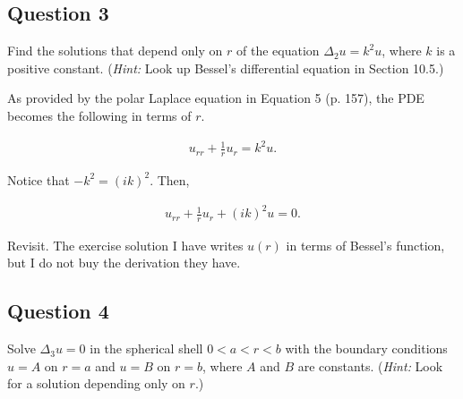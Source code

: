 \documentclass[a4paper, 10pt]{article}
\newenvironment{answer}[1][Answer]{\begin{trivlist}
\item[\hskip\labelsep{\textit{#1.}}]}{\end{trivlist}}
\begin{document}
\subsection{Question 3}

Find the solutions that depend only on $r$ of the equation $\Delta_2 u = k^2 u$, where $k$ is a positive constant. (\textit{Hint:} Look up Bessel's differential equation in Section 10.5.)

\begin{answer}
    As provided by the polar Laplace equation in Equation 5 (p. 157), the PDE becomes the following in terms of $r$.

    \begin{align*}
        u_{r r} + \frac{1}{r} u_{r} = k^2 u.
    \end{align*}

    Notice that $-k^2 = (ik)^2$. Then,

    \begin{align*}
        u_{r r} + \frac{1}{r} u_r + (i k)^2 u = 0.
    \end{align*}

    {\color{blue} Revisit. The exercise solution I have writes $u(r)$ in terms of Bessel's function, but I do not buy the derivation they have.}
\end{answer}

\subsection{Question 4}

Solve $\Delta_3 u = 0$ in the spherical shell $0<a<r<b$ with the boundary conditions $u=A$ on $r=a$ and $u=B$ on $r=b$, where $A$ and $B$ are constants. (\textit{Hint:} Look for a solution depending only on $r$.)
\end{document}
